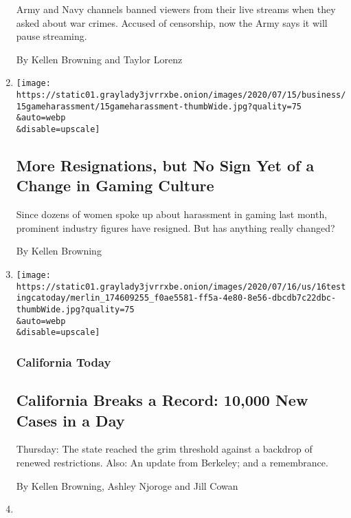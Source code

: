\begin{enumerate}
  Army and Navy channels banned viewers from their live streams when
  they asked about war crimes. Accused of censorship, now the Army says
  it will pause streaming.

  By Kellen Browning and Taylor Lorenz
\item
  \href{/2020/07/19/technology/gaming-harassment.html}{}

  \texttt{[image: https://static01.graylady3jvrrxbe.onion/images/2020/07/15/business/15gameharassment/15gameharassment-thumbWide.jpg?quality=75\\\&auto=webp\\\&disable=upscale]}

  \hypertarget{more-resignations-but-no-sign-yet-of-a-change-in-gaming-culture}{%
  \subsection{More Resignations, but No Sign Yet of a Change in Gaming
  Culture}\label{more-resignations-but-no-sign-yet-of-a-change-in-gaming-culture}}

  Since dozens of women spoke up about harassment in gaming last month,
  prominent industry figures have resigned. But has anything really
  changed?

  By Kellen Browning
\item
  \href{/2020/07/16/us/california-coronavirus-cases.html}{}

  \texttt{[image: https://static01.graylady3jvrrxbe.onion/images/2020/07/16/us/16testingcatoday/merlin\_174609255\_f0ae5581-ff5a-4e80-8e56-dbcdb7c22dbc-thumbWide.jpg?quality=75\\\&auto=webp\\\&disable=upscale]}

  \hypertarget{california-today}{%
  \subsubsection{California Today}\label{california-today}}

  \hypertarget{california-breaks-a-record-10000-new-cases-in-a-day}{%
  \subsection{California Breaks a Record: 10,000 New Cases in a
  Day}\label{california-breaks-a-record-10000-new-cases-in-a-day}}

  Thursday: The state reached the grim threshold against a backdrop of
  renewed restrictions. Also: An update from Berkeley; and a
  remembrance.

  By Kellen Browning, Ashley Njoroge and Jill Cowan
\item
  \href{/2020/07/16/style/xset-gaming-lifestyle-company-faze-clan.html}{}


\end{enumerate}
